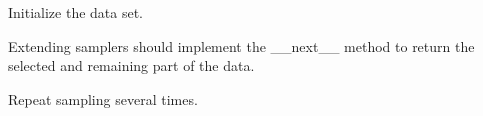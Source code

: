 \documentclass[letterpaper,10pt,english]{sphinxmanual}
\begin{document}
\begin{fulllineitems}
\begin{fulllineitems}
\label{cp.evaluation:cp.evaluation.Sampler.__init__}
Initialize the data set.

\end{fulllineitems}


\begin{fulllineitems}
\label{cp.evaluation:cp.evaluation.Sampler.__iter__}
\end{fulllineitems}


\begin{fulllineitems}
\label{cp.evaluation:cp.evaluation.Sampler.__next__}
Extending samplers should implement the \_\_next\_\_ method to return the selected
and remaining part of the data.

\end{fulllineitems}


\begin{fulllineitems}
\label{cp.evaluation:cp.evaluation.Sampler.repeat}
Repeat sampling several times.

\end{fulllineitems}


\end{fulllineitems}

\end{document}
